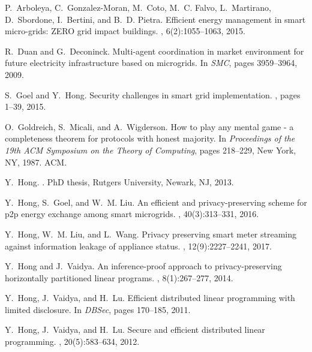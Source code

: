 \documentclass{article}
\begin{document}
\begin{thebibliography}{10}
	
	P.~Arboleya, C.~Gonzalez{-}Moran, M.~Coto, M.~C. Falvo, L.~Martirano,
	D.~Sbordone, I.~Bertini, and B.~D. Pietra.
	\newblock Efficient energy management in smart micro-grids: {ZERO} grid impact
	buildings.
	, 6(2):1055--1063, 2015.
	
	R.~Duan and G.~Deconinck.
	\newblock Multi-agent coordination in market environment for future electricity
	infrastructure based on microgrids.
	\newblock In {\em SMC}, pages 3959--3964, 2009.
	
	S.~Goel and Y.~Hong.
	\newblock Security challenges in smart grid implementation.
	, pages 1--39, 2015.
	
	O.~Goldreich, S.~Micali, and A.~Wigderson.
	\newblock How to play any mental game - a completeness theorem for protocols
	with honest majority.
	\newblock In {\em Proceedings of the 19th {ACM} Symposium on the Theory of
		Computing}, pages 218--229, New York, NY, 1987. ACM.
	
	Y.~Hong.
	.
	\newblock PhD thesis, Rutgers University, Newark, NJ, 2013.
	
	Y.~Hong, S.~Goel, and W.~M. Liu.
	\newblock An efficient and privacy-preserving scheme for p2p energy exchange
	among smart microgrids.
	, 40(3):313--331, 2016.
	
	Y.~Hong, W.~M. Liu, and L.~Wang.
	\newblock Privacy preserving smart meter streaming against information leakage
	of appliance status.
	,
	12(9):2227--2241, 2017.
	
	Y.~Hong and J.~Vaidya.
	\newblock An inference-proof approach to privacy-preserving horizontally
	partitioned linear programs.
	, 8(1):267--277, 2014.
	
	Y.~Hong, J.~Vaidya, and H.~Lu.
	\newblock Efficient distributed linear programming with limited disclosure.
	\newblock In {\em DBSec}, pages 170--185, 2011.
	
	Y.~Hong, J.~Vaidya, and H.~Lu.
	\newblock Secure and efficient distributed linear programming.
	, 20(5):583--634, 2012.
	

\end{thebibliography}
\end{document}
